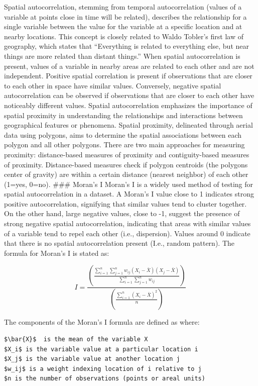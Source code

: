 \documentclass[
]{article}
\begin{document}
Spatial autocorrelation, stemming from temporal autocorrelation (values
of a variable at points close in time will be related), describes the
relationship for a single variable between the value for the variable at
a specific location and at nearby locations. This concept is closely
related to Waldo Tobler's first law of geography, which states that
``Everything is related to everything else, but near things are more
related than distant things.'' When spatial autocorrelation is present,
values of a variable in nearby areas are related to each other and are
not independent. Positive spatial correlation is present if observations
that are closer to each other in space have similar values. Conversely,
negative spatial autocorrelation can be observed if observations that
are closer to each other have noticeably different values. Spatial
autocorrelation emphasizes the importance of spatial proximity in
understanding the relationships and interactions between geographical
features or phenomena. Spatial proximity, delineated through aerial data
using polygons, aims to determine the spatial associations between each
polygon and all other polygons. There are two main approaches for
measuring proximity: distance-based measures of proximity and
contiguity-based measures of proximity. Distance-based measures check if
polygon centroids (the polygons center of gravity) are within a certain
distance (nearest neighbor) of each other (1=yes, 0=no). \#\#\# Moran's
I Moran's I is a widely used method of testing for spatial
autocorrelation in a dataset. A Moran's I value close to 1 indicates
strong positive autocorrelation, signifying that similar values tend to
cluster together. On the other hand, large negative values, close to -1,
suggest the presence of strong negative spatial autocorrelation,
indicating that areas with similar values of a variable tend to repel
each other (i.e., dispersion). Values around 0 indicate that there is no
spatial autocorrelation present (I.e., random pattern). The formula for
Moran's I is stated as:

\[I = \frac{\left(\frac{ \sum_{i=1}^{n} \sum_{j=1}^{n} w_{ij} (X_i - \bar{X})(X_j - \bar{X}) }{\sum_{i=1}^{n} \sum_{j=1}^{n} w_{ij} }\right)}{\left( \frac{\sum_{i=1}^{n} (X_i - \bar{X})^2}{n} \right)}\]

The components of the Moran's I formula are defined as where:

\begin{verbatim}
$\bar{X}$  is the mean of the variable X
$X_i$ is the variable value at a particular location i
$X_j$ is the variable value at another location j
$w_ij$ is a weight indexing location of i relative to j
$n is the number of observations (points or areal units)
\end{verbatim}
\end{document}
